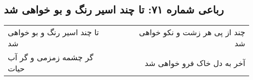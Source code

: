 \begin{center}
\section*{رباعی شماره ۷۱: تا چند اسیر رنگ و بو خواهی شد}
\label{sec:sh071}
\begin{longtable}{l p{0.5cm} r}
تا چند اسیر رنگ و بو خواهی شد
&&
چند از پی هر زشت و نکو خواهی شد
\\
گر چشمه زمزمی و گر آب حیات
&&
آخر به دل خاک فرو خواهی شد
\\
\end{longtable}
\end{center}
